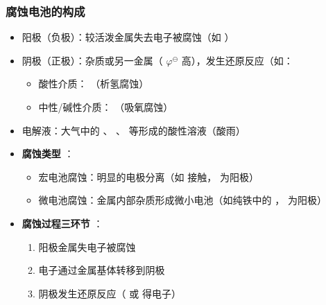 \subsubsection{腐蚀电池的构成} 
\begin{itemize} 
    \item 阳极（负极）：较活泼金属失去电子被腐蚀（如  ）
    \item 阴极（正极）：杂质或另一金属（ $ \varphi^\ominus $ 高），发生还原反应（如：
    \begin{itemize} 
        \item 酸性介质：  （析氢腐蚀）
        \item 中性/碱性介质：  （吸氧腐蚀）
    \end{itemize} 
    \item 电解液：大气中的  、  、  等形成的酸性溶液（酸雨）
    
    \item \textbf{腐蚀类型} ：
    \begin{itemize} 
        \item 宏电池腐蚀：明显的电极分离（如  接触，  为阳极）
        \item 微电池腐蚀：金属内部杂质形成微小电池（如纯铁中的  ，  为阳极）
    \end{itemize} 
    
    \item \textbf{腐蚀过程三环节} ：
    \begin{enumerate} 
        \item 阳极金属失电子被腐蚀
        \item 电子通过金属基体转移到阴极
        \item 阴极发生还原反应（  或  得电子）
    \end{enumerate} 
\end{itemize} 

